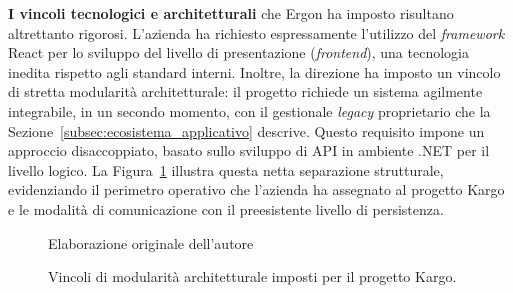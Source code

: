 \textbf{I vincoli tecnologici e architetturali} che Ergon ha imposto risultano altrettanto rigorosi. L'azienda ha richiesto espressamente l'utilizzo del \textit{framework} React per lo sviluppo del livello di presentazione (\textit{frontend}), una tecnologia inedita rispetto agli standard interni. Inoltre, la direzione ha imposto un vincolo di stretta modularità architetturale: il progetto richiede un sistema agilmente integrabile, in un secondo momento, con il gestionale \textit{legacy} proprietario che la Sezione~\ref{subsec:ecosistema_applicativo} descrive. Questo requisito impone un approccio disaccoppiato, basato sullo sviluppo di API in ambiente .NET per il livello logico. La Figura~\ref{fig:vincoli_architettura_kargo} illustra questa netta separazione strutturale, evidenziando il perimetro operativo che l'azienda ha assegnato al progetto Kargo e le modalità di comunicazione con il preesistente livello di persistenza.

\begin{figure}[H]
    \centering
    \caption{Vincoli di modularità architetturale imposti per il progetto Kargo.}
    \vspace{0.1cm}
    {\footnotesize Elaborazione originale dell'autore\par}
    \label{fig:vincoli_architettura_kargo}
\end{figure}

